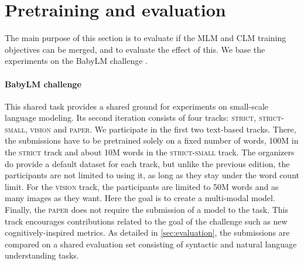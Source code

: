 \section{Pretraining and evaluation}

The main purpose of this section is to evaluate if the MLM and CLM training objectives can be merged, and to evaluate the effect of this. We base the experiments on the BabyLM challenge \citep{babylm-2024}.

\paragraph{BabyLM challenge}

This shared task provides a shared ground for experiments on small-scale language modeling. Its second iteration consists of four tracks: \textsc{strict}, \textsc{strict-small}, \textsc{vision} and \textsc{paper}. We participate in the first two text-based tracks. There, the submissions have to be pretrained solely on a fixed number of words, 100M in the \textsc{strict} track and about 10M words in the \textsc{strict-small} track. The organizers do provide a default dataset for each track, but unlike the previous edition, the participants are not limited to using it, as long as they stay under the word count limit. For the \textsc{vision} track, the participants are limited to 50M words and as many images as they want. Here the goal is to create a multi-modal model. Finally, the \textsc{paper} does not require the submission of a model to the task. This track encourages contributions related to the goal of the challenge such as new cognitively-inspired metrics. As detailed in \cref{sec:evaluation}, the submissions are compared on a shared evaluation set consisting of syntactic and natural language understanding tasks.

